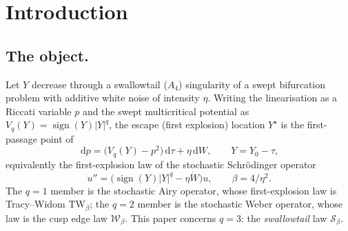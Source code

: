 \documentclass[11pt,reqno]{amsart}
\theoremstyle{plain}
\theoremstyle{definition}
\theoremstyle{remark}
\newcommand{\dd}{\,\mathrm{d}}
\newcommand{\W}{\mathcal{W}}
\newcommand{\Sw}{\mathcal{S}}
\begin{document}
\begin{abstract}
$I(s)=s^{2q+1}/[2(2q+1)]$ and verify it numerically for $q=1,\dots,5$, correcting a factor-two
error in the previously quoted constant. Matched-order calibration against the cusp places the pair
at $\theta\approx33$--$42^\circ$, robustly \emph{below} the cusp's $50^\circ$: the phase is not
inherited. Finally, a median Borel--Pad\'e resummation of the eight coefficients reconstructs the
Monte-Carlo-free ground truth to better than $2\%$ for $\beta\ge8$ and to $9\%$ at $\beta=4$, with
an error that rises \emph{monotonically} in $\eta^2$ beyond the ground-truth noise floor --- establishing that the representation is correct and
the approximant merely starved outside its disc. At $\beta=2$ the reconstruction is $36\%$ high and
remains open.
\end{abstract}

\maketitle

\section{Introduction}

\subsection{The object.}
Let $Y$ decrease through a swallowtail ($A_4$) singularity of a swept bifurcation problem with
additive white noise of intensity $\eta$. Writing the linearisation as a Riccati variable $p$ and
the swept multicritical potential as $V_q(Y)=\operatorname{sign}(Y)|Y|^q$, the escape (first
explosion) location $Y^\star$ is the first-passage point of
\begin{equation}\label{eq:riccati}
\dd p=\bigl(V_q(Y)-p^2\bigr)\dd\tau+\eta\dd W,\qquad Y=Y_0-\tau,
\end{equation}
equivalently the first-explosion law of the stochastic Schr\"odinger operator
\begin{equation}\label{eq:op}
u''=\bigl(\operatorname{sign}(Y)|Y|^q-\eta\dot W\bigr)u,\qquad \beta=4/\eta^2 .
\end{equation}
The $q=1$ member is the stochastic Airy operator, whose first-explosion law is Tracy--Widom
$\mathrm{TW}_\beta$; the $q=2$ member is the stochastic Weber operator, whose law is the cusp
edge law $\W_\beta$. This paper concerns $q=3$: the \emph{swallowtail} law $\Sw_\beta$.
\end{document}
